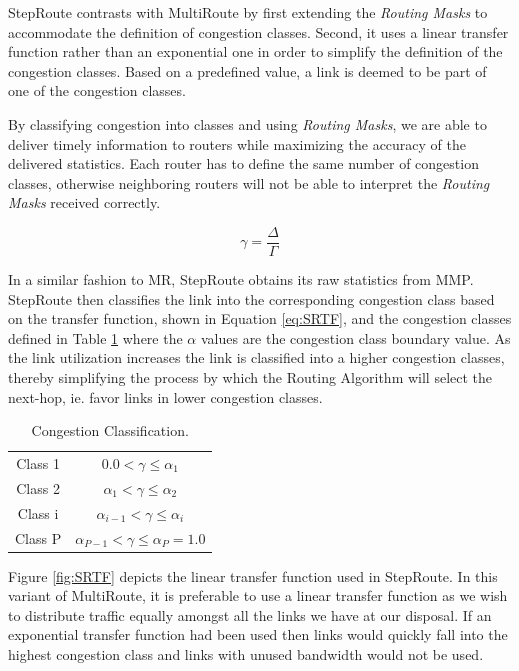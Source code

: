 StepRoute contrasts with MultiRoute by first extending the \textit{Routing Masks} to accommodate the definition of congestion classes. Second, it uses a linear transfer function rather than an exponential one in order to simplify the definition of the congestion classes. Based on a predefined value, a link is deemed to be part of one of the congestion classes. 

By classifying congestion into classes and using \textit{Routing Masks}, we are able to deliver timely information to routers while maximizing the accuracy of the delivered statistics. Each router has to define the same number of congestion classes, otherwise neighboring routers will not be able to interpret the \textit{Routing Masks} received correctly.  

 \begin{equation}
\gamma = \frac{\Delta}{\Gamma}
\label{eq:SRTF}
\end{equation}

In a similar fashion to MR, StepRoute obtains its raw statistics from MMP.
StepRoute then classifies the link into the corresponding congestion class based
on the transfer function, shown in Equation \ref{eq:SRTF}, and the congestion
classes defined in Table \ref{tab:CongClass} where the $\alpha$ values are the congestion class boundary value. As the link utilization increases
the link is classified into a higher congestion classes, thereby simplifying the
process by which the Routing Algorithm will select the next-hop, ie. favor
links in lower congestion classes.

\begin{table}[h!]
  \begin{center}
    \begin{tabular}{| c || c |}
\hline
 Class 1  & $ 0.0 < \gamma \leq \alpha_1$ \\
 Class 2  & $ \alpha_1 < \gamma \leq \alpha_2$ \\
 Class i  & $ \alpha_{i-1} < \gamma \leq \alpha_i$ \\
 Class P  & $ \alpha_{P-1} < \gamma \leq \alpha_P = 1.0$ \\
\hline
    \end{tabular}
  \end{center}
  \caption{Congestion Classification.}
\label{tab:CongClass}
\end{table}

Figure \ref{fig:SRTF} depicts the linear transfer function used in StepRoute. In
this variant of MultiRoute, it is preferable to use a linear transfer function
as we wish to distribute traffic equally amongst all the links we have at our
disposal. If an exponential transfer function had been used then links would
quickly fall into the highest congestion class and links with unused
bandwidth would not be used. 


